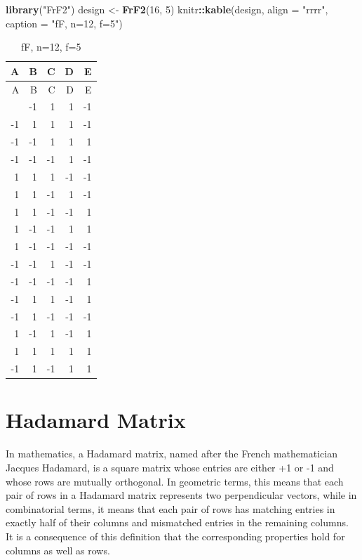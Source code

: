 \documentclass[
  12pt,
  a4paper,
]{article}
\newenvironment{Shaded}{\begin{snugshade}}{\end{snugshade}}
\newcommand{\AttributeTok}[1]{\textcolor[rgb]{0.13,0.29,0.53}{#1}}
\newcommand{\DecValTok}[1]{\textcolor[rgb]{0.00,0.00,0.81}{#1}}
\newcommand{\FunctionTok}[1]{\textcolor[rgb]{0.13,0.29,0.53}{\textbf{#1}}}
\newcommand{\NormalTok}[1]{#1}
\newcommand{\OtherTok}[1]{\textcolor[rgb]{0.56,0.35,0.01}{#1}}
\newcommand{\SpecialCharTok}[1]{\textcolor[rgb]{0.81,0.36,0.00}{\textbf{#1}}}
\newcommand{\StringTok}[1]{\textcolor[rgb]{0.31,0.60,0.02}{#1}}
\numberwithin{equation}{section}
\theoremstyle{plain}
\theoremstyle{definition}
\theoremstyle{remark}
\theoremstyle{note}
\begin{document}
\begin{Shaded}
\begin{Highlighting}[]
\FunctionTok{library}\NormalTok{(}\StringTok{"FrF2"}\NormalTok{)}
\NormalTok{design }\OtherTok{\textless{}{-}} \FunctionTok{FrF2}\NormalTok{(}\DecValTok{16}\NormalTok{, }\DecValTok{5}\NormalTok{)}
\NormalTok{knitr}\SpecialCharTok{::}\FunctionTok{kable}\NormalTok{(design, }\AttributeTok{align =} \StringTok{"rrrr"}\NormalTok{, }\AttributeTok{caption =} \StringTok{"fF, n=12, f=5"}\NormalTok{)}
\end{Highlighting}
\end{Shaded}

\begin{longtable}[]{@{}rrrrr@{}}
\caption{fF, n=12, f=5}\tabularnewline
\toprule\noalign{}
A & B & C & D & E \\
\midrule\noalign{}
\endfirsthead
\toprule\noalign{}
A & B & C & D & E \\
\midrule\noalign{}
\endhead
\bottomrule\noalign{}
\endlastfoot
1 & -1 & 1 & 1 & -1 \\
-1 & 1 & 1 & 1 & -1 \\
-1 & -1 & 1 & 1 & 1 \\
-1 & -1 & -1 & 1 & -1 \\
1 & 1 & 1 & -1 & -1 \\
1 & 1 & -1 & 1 & -1 \\
1 & 1 & -1 & -1 & 1 \\
1 & -1 & -1 & 1 & 1 \\
1 & -1 & -1 & -1 & -1 \\
-1 & -1 & 1 & -1 & -1 \\
-1 & -1 & -1 & -1 & 1 \\
-1 & 1 & 1 & -1 & 1 \\
-1 & 1 & -1 & -1 & -1 \\
1 & -1 & 1 & -1 & 1 \\
1 & 1 & 1 & 1 & 1 \\
-1 & 1 & -1 & 1 & 1 \\
\end{longtable}

\newpage

\hypertarget{hadamard-matrix}{%
\section{Hadamard Matrix}\label{hadamard-matrix}}

In mathematics, a Hadamard matrix, named after the French mathematician
Jacques Hadamard, is a square matrix whose entries are either +1 or -1
and whose rows are mutually orthogonal. In geometric terms, this means
that each pair of rows in a Hadamard matrix represents two perpendicular
vectors, while in combinatorial terms, it means that each pair of rows
has matching entries in exactly half of their columns and mismatched
entries in the remaining columns. It is a consequence of this definition
that the corresponding properties hold for columns as well as rows.
\end{document}
